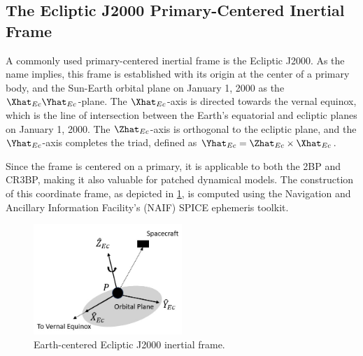 \subsection{The Ecliptic J2000 Primary-Centered Inertial Frame}
A commonly used primary-centered inertial frame is the Ecliptic J2000. As the name implies, this
frame is established with its origin at the center of a primary body, and the Sun-Earth orbital
plane on January 1, 2000 as the $\Xhat_{Ec}\Yhat_{Ec}$-plane. The $\Xhat_{Ec}$-axis is directed
towards the vernal equinox, which is the line of intersection between the Earth's equatorial and
ecliptic planes on January 1, 2000. The $\Zhat_{Ec}$-axis is orthogonal to the ecliptic plane, and
the $\Yhat_{Ec}$-axis completes the triad, defined as $\Yhat_{Ec}=\Zhat_{Ec}\times\Xhat_{Ec}$.

Since the frame is centered on a
primary, it is applicable to both the 2BP and CR3BP, making it also valuable for patched dynamical
models. The construction of this coordinate frame, as depicted in \cref{fig:eclipJ2000Frame}, is
computed using the Navigation and Ancillary Information Facility's (NAIF) SPICE ephemeris
toolkit\cite{Semenov:2023}.

\begin{figure}[ht]
    \centering
    \includegraphics[width=0.5\textwidth]{figures/EclipJ2000Frame.jpg}
    \caption{Earth-centered Ecliptic J2000 inertial frame.}
    \label{fig:eclipJ2000Frame}
\end{figure}
